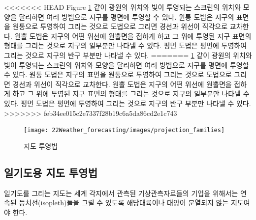

<<<<<<< HEAD
Figure \ref{fig:map_projection} \과 같이 광원의 위치와 빛이 투영되는 스크린의 위치와 모양을 달리하면 여러 방법으로 지구를 평면에 투영할 수 있다. 원통 도법은 지구의 표면을 원통으로 투영하여 그리는 것으로 도법으로 그리면 경선과 위선이 직각으로 교차한다. 원뿔 도법은 지구의 어떤 위선에 원뿔면을 접하게 하고 그 위에 투영된 지구 표면의 형태를 그리는 것으로 지구의 일부분만 나타낼 수 있다. 평면 도법은 평면에 투영하여 그리는 것으로 지구의 반구 부분만 나타낼 수 있다.
=======
\ref{fig:map_projection} \과 같이 광원의 위치와 빛이 투영되는 스크린의 위치와 모양을 달리하면 여러 방법으로 지구를 평면에 투영할 수 있다. 원통 도법은 지구의 표면을 원통으로 투영하여 그리는 것으로 도법으로 그리면 경선과 위선이 직각으로 교차한다. 원뿔 도법은 지구의 어떤 위선에 원뿔면을 접하게 하고 그 위에 투영된 지구 표면의 형태를 그리는 것으로 지구의 일부분만 나타낼 수 있다. 평면 도법은 평면에 투영하여 그리는 것으로 지구의 반구 부분만 나타낼 수 있다.
>>>>>>> feb34ee015c2e7337f28b19c6a5da86cd2e1c743

\begin{figure}[h]
	\centering
	\texttt{[image: 22Weather\_forecasting/images/projection\_families]}
	\caption{지도 투영법}
	\label{fig:map_projection}
\end{figure}

\subsection{일기도용 지도 투영법}
일기도를 그리는 지도는 세계 각지에서 관측된 기상관측자료들의 기입을 위해서는 연속된 등치선(isopleth)들을 그릴 수 있도록 해당대륙이나 대양이 분열되지 않는 지도여야 한다.

